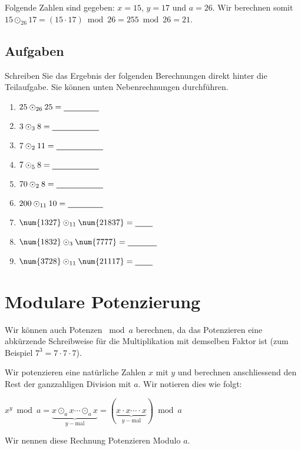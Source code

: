 \begin{example}
Folgende Zahlen sind gegeben: $x = 15$, $y = 17$ und $a = 26$. Wir berechnen somit $15 \odot_{26} 17 = (15 \cdot 17) \bmod 26 = 255 \bmod 26 = 21$.
\end{example}

\subsection{Aufgaben}

Schreiben Sie das Ergebnis der folgenden Berechnungen direkt hinter die Teilaufgabe. Sie können unten Nebenrechnungen durchführen.

\begin{multicols}{3}
\begin{enumerate}
\item $25 \odot_{26} 25 = \rule[-0.75mm]{1.5cm}{.5pt}$
\item $3 \odot_{3} 8 = \rule[-0.75mm]{2cm}{.5pt}$
\item $7 \odot_{2} 11 = \rule[-0.75mm]{2cm}{.5pt}$
\item $7 \odot_{5} 8 = \rule[-0.75mm]{2cm}{.5pt}$
\item $70 \odot_{2} 8 = \rule[-0.75mm]{2cm}{.5pt}$
\item $200 \odot_{11} 10 = \rule[-0.75mm]{1.5cm}{.5pt}$
\item $\num{1327} \odot_{11} \num{21837} = \rule[-0.75mm]{0.75cm}{.5pt}$
\item $\num{1832} \odot_{3} \num{7777} = \rule[-0.75mm]{1.25cm}{.5pt}$
\item $\num{3728} \odot_{11} \num{21117} = \rule[-0.75mm]{0.75cm}{.5pt}$
\end{enumerate}
\end{multicols}


\newpage

\section{Modulare Potenzierung}

Wir können auch Potenzen $\bmod a$ berechnen, da das Potenzieren eine abkürzende Schreibweise für die Multiplikation mit demselben Faktor ist (zum Beispiel $7^3 = 7 \cdot 7 \cdot 7$).

\begin{definition}
Wir potenzieren eine natürliche Zahlen $x$ mit $y$ und berechnen anschliessend den Rest der ganzzahligen Division mit $a$. Wir notieren dies wie folgt:

\begin{center}
$x^y \bmod a = \underbrace{x \odot_{a} x \cdots \odot_{a} x}_{y-\text{mal}} = (\underbrace{x \cdot x \cdots \cdot x}_{y-\text{mal}}) \bmod a$
\end{center}

Wir nennen diese Rechnung Potenzieren Modulo $a$.
\end{definition}

